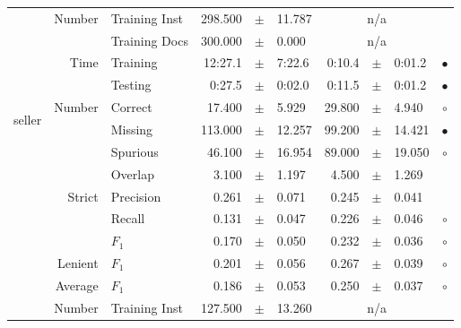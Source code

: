 \begin{longtable}{|r|r|l||rcl|rcl|c|}
\cline{2-10} & \multirow{2}{*}{    Number} &   Training Inst &     298.500 &  $\pm$  &      11.787 &    \multicolumn{3}{c|}{n/a}         &  \\
\cline{3-10} &                             &   Training Docs &     300.000 &  $\pm$  &       0.000 &    \multicolumn{3}{c|}{n/a}         &  \\
\cline{2-10} & \multirow{2}{*}{      Time} &        Training &     12:27.1 &  $\pm$  &      7:22.6 &      0:10.4 &  $\pm$  &      0:01.2 & $\bullet$ \\
\cline{3-10} &                             &         Testing &      0:27.5 &  $\pm$  &      0:02.0 &      0:11.5 &  $\pm$  &      0:01.2 & $\bullet$ \\
\hline
\hline
\multirow{11}{*}{\begin{sideways}seller\end{sideways} }
             & \multirow{4}{*}{    Number} &         Correct &      17.400 &  $\pm$  &       5.929 &      29.800 &  $\pm$  &       4.940 & $\circ$ \\
\cline{3-10} &                             &         Missing &     113.000 &  $\pm$  &      12.257 &      99.200 &  $\pm$  &      14.421 & $\bullet$ \\
\cline{3-10} &                             &        Spurious &      46.100 &  $\pm$  &      16.954 &      89.000 &  $\pm$  &      19.050 & $\circ$ \\
\cline{3-10} &                             &         Overlap &       3.100 &  $\pm$  &       1.197 &       4.500 &  $\pm$  &       1.269 &  \\
\cline{2-10} & \multirow{3}{*}{    Strict} &       Precision &       0.261 &  $\pm$  &       0.071 &       0.245 &  $\pm$  &       0.041 &  \\
\cline{3-10} &                             &          Recall &       0.131 &  $\pm$  &       0.047 &       0.226 &  $\pm$  &       0.046 & $\circ$ \\
\cline{3-10} &                             &           $F_1$ &       0.170 &  $\pm$  &       0.050 &       0.232 &  $\pm$  &       0.036 & $\circ$ \\
\cline{2-10} &                     Lenient &           $F_1$ &       0.201 &  $\pm$  &       0.056 &       0.267 &  $\pm$  &       0.039 & $\circ$ \\
\cline{2-10} &                     Average &           $F_1$ &       0.186 &  $\pm$  &       0.053 &       0.250 &  $\pm$  &       0.037 & $\circ$ \\
\cline{2-10} & \multirow{2}{*}{    Number} &   Training Inst &     127.500 &  $\pm$  &      13.260 &    \multicolumn{3}{c|}{n/a}         &  \\

\end{longtable}
